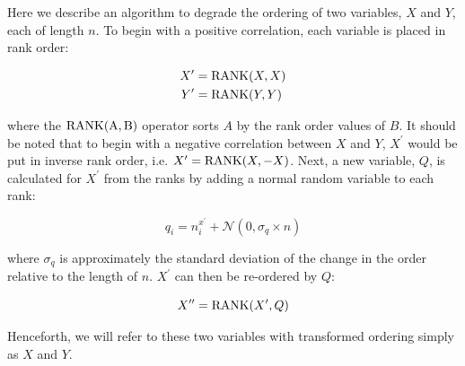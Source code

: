\documentclass[a4paper,fleqn,usenatbib]{mnras}
\begin{document}
Here we describe an algorithm to degrade the ordering of two variables, $X$ and $Y$, each of length $n$.  To begin with a positive correlation, each variable is placed in rank order:  
%
\begin{linenomath}
\begin{align}
X^{\prime} &= {\rm RANK}(X,X) \nonumber \\
Y^{\prime} &= {\rm RANK}(Y,Y) 
\end{align}
\end{linenomath}
%
where the ${\rm RANK(A,B)}$ operator sorts $A$ by the rank order values of $B$.  It should be noted that to begin with a negative correlation between $X$ and $Y$, $X^{\prime}$ would be put in inverse rank order, i.e. $X^{\prime} = {\rm RANK}(X,-X)$.  Next, a new variable, $Q$, is calculated for $X^{\prime}$ from the ranks by adding a normal random variable to each rank:   
%
\begin{linenomath}
\begin{equation}
q_i = n^{x^{\prime}}_i + \mathcal{N}(0, \sigma_q \times n)
\end{equation}
\end{linenomath}
%
where $\sigma_q$ is approximately the standard deviation of the change in the order relative to the length of $n$.  $X^{\prime}$ can then be re-ordered by $Q$:
%
\begin{linenomath}
\begin{equation}
X^{\prime\prime}  = {\rm RANK}(X^{\prime}, Q)
\end{equation}
\end{linenomath}
%
Henceforth, we will refer to these two variables with transformed ordering simply as $X$ and $Y$.  %
\end{document}
